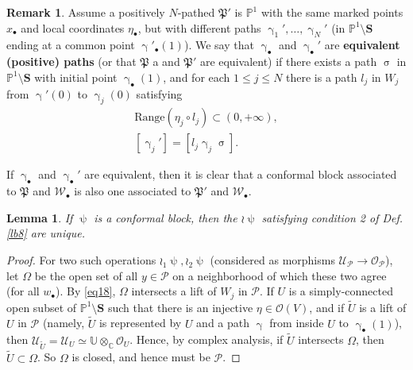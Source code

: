 \documentclass[12pt,a4paper,notitlepage]{article}
\theoremstyle{definition}
\newtheorem{rem}[df]{Remark}
\theoremstyle{plain}
\newtheorem{lm}[df]{Lemma}
\newcommand{\fk}{\mathfrak}
\newcommand{\mc}{\mathcal}
\newcommand{\wtd}{\widetilde}
\newcommand{\scr}{\mathscr}
\newcommand{\blt}{\bullet}
\newcommand{\Ubb}{\mathbb U}
\newcommand{\Cbb}{\mathbb C}
\newcommand{\Pbb}{\mathbb P}
\newcommand{\Sbf}{\mathbf{S}}
\numberwithin{equation}{subsection}
\begin{document}
\begin{rem}\label{lb2}
Assume a positively $N$-pathed $\fk P'$ is $\Pbb^1$ with the same marked points $x_\blt$ and local coordinates $\eta_\blt$, but with different paths $\upgamma_1',\dots,\upgamma_N'$ (in $\Pbb^1\setminus\Sbf$ ending at a common point $\upgamma'_\blt(1)$). We say that $\upgamma_\blt$ and $\upgamma_\blt'$ are \textbf{equivalent (positive) paths} (or that $\fk P$ a and $\fk P'$ are equivalent)  if there exists a path $\upsigma$ in $\Pbb^1\setminus\Sbf$ with initial point $\upgamma_\blt(1)$, and for each $1\leq j\leq N$ there is a path $l_j$ in $W_j$ from $\upgamma'(0)$ to $\upgamma_j(0)$ satisfying 
\begin{gather}
	\mathrm{Range}(\eta_j\circ l_j)\subset(0,+\infty),\label{eq53}\\
	[\upgamma_j']=[l_j\upgamma_j\upsigma].	\label{eq66}
\end{gather}


If $\upgamma_\blt$ and $\upgamma_\blt'$ are equivalent, then it is clear that a conformal block associated to $\fk P$ and $\mc W_\blt$ is also one associated to $\fk P'$ and $\mc W_\blt$.
\end{rem}





\begin{lm}
If $\uppsi$ is a conformal block, then the $\wr\uppsi$ satisfying condition 2 of Def. \ref{lb8} are unique. 
\end{lm}

\begin{proof}
For two such operations $\wr_1\uppsi,\wr_2\uppsi$ (considered as morphisms $\scr U_{\mc P}\rightarrow\scr O_{\mc P}$), let $\Omega$ be the open set of all $y\in\mc P$ on a neighborhood of which these two agree (for all $w_\blt$). By \eqref{eq18}, $\Omega$ intersects a lift of $W_j$ in $\mc P$. If $U$ is a simply-connected open subset of $\Pbb^1\setminus\Sbf$ such that there is an injective $\eta\in\scr O(V)$, and if $\wtd U$ is a lift of $U$ in $\mc P$ (namely, $\wtd U$ is represented by $U$ and a path $\upgamma$ from inside $U$ to $\upgamma_\blt(1)$), then $\scr U_{\wtd U}=\scr U_U\simeq\Ubb\otimes_\Cbb\scr O_U$. Hence, by complex analysis, if $\wtd U$ intersects $\Omega$,  then $\wtd U\subset\Omega$. So $\Omega$ is closed, and hence must be $\mc P$.
\end{proof}
\end{document}
